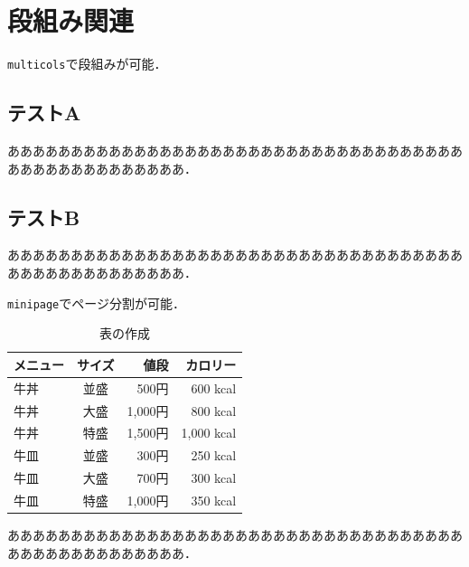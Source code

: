 \documentclass[uplatex]{jsarticle}
\begin{document}
\section{段組み関連}

\verb|multicols|で段組みが可能．

\begin{multicols}{2}
\subsection{テストA}
ああああああああああああああああああああああああああああああああああああああああああああああああああ．
\subsection{テストB}
ああああああああああああああああああああああああああああああああああああああああああああああああああ．
\end{multicols}

\verb|minipage|でページ分割が可能．

\begin{minipage}{0.6\textwidth}
\begin{table}[H]
  \caption{表の作成}
  \label{table:text}
  \centering
  \begin{tabular}{l|crr}
    \hline 
    メニュー & サイズ & 値段 & カロリー \\ \hline 
    牛丼 & 並盛 & 500円 & 600 kcal \\
    牛丼 & 大盛 & 1,000円 & 800 kcal \\
    牛丼 & 特盛 & 1,500円 & 1,000 kcal \\ \hline
    牛皿 & 並盛 & 300円 & 250 kcal \\
    牛皿 & 大盛 & 700円 & 300 kcal \\
    牛皿 & 特盛 & 1,000円 & 350 kcal \\
    \hline
  \end{tabular}
\end{table}
\end{minipage}
\hfill
\begin{minipage}{0.35\textwidth}
    ああああああああああああああああああああああああああああああああああああああああああああああああああ．
\end{minipage}
\end{document}
